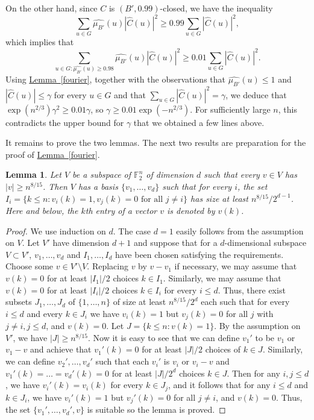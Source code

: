 \documentclass[11pt]{article}
\numberwithin{equation}{section}
\newtheorem{lemma}[theorem]{Lemma}
\theoremstyle{definition}
\theoremstyle{plain}
\newcommand{\expref}[2]{\hyperref[#2]{#1~\ref{#2}}}
\newcommand\g{\gamma}
\newcommand \hC {{\hat C}}
\begin{document}
On the other hand, since $C$ is $(B',0.99)$-closed, we have the inequality
\[\sum_{u\in G} \widehat{\mu_{B'}}(u)|\hC(u)|^2\geq 0.99\sum_{u\in G}|\hC(u)|^2,\]
which implies that 
\[\sum_{u\in G: \widehat{\mu_{B'}}(u)\geq 0.98} \widehat{\mu_{B'}}(u)|\hC(u)|^2\geq 0.01\sum_{u\in G}|\hC(u)|^2.\]
Using \expref{Lemma}{fourier}, together with the observations that $\widehat{\mu_{B'}}(u)\leq 1$ and $|\hC(u)|\leq \g$ for every $u\in G$ and that $\sum_{u\in G}|\hC(u)|^2=\g$, we deduce that $\exp(n^{2/3})\g^2\geq 0.01 \g$, so $\g\geq 0.01\exp(-n^{2/3})$. For sufficiently large $n$, this contradicts the upper bound for $\g$ that we obtained a few lines above. 
\medskip

It remains to prove the two lemmas. The next two results are preparation for the proof of \expref{Lemma}{fourier}.

\begin{lemma}\label{Claim2} Let $V$ be a subspace of $\mathbb{F}_2^n$ of dimension $d$ such that every $v\in V$ has $|v|\geq n^{8/15}$. Then $V$ has a basis $\{v_1,\dots,v_d\}$ such that for every $i$, the set $I_i=\{k\leq n: v_i(k)=1,v_j(k)=0 \text{ for all } j\neq i\}$ has size at least $n^{8/15}/2^{d-1}$. Here and below, the $k$th entry of a vector $v$ is denoted by $v(k)$.
\end{lemma}

\begin{proof} We use induction on $d$. The case $d=1$ easily follows from the assumption on $V$. Let $V'$ have dimension $d+1$ and suppose that for a $d$-dimensional subspace $V\subset V'$, $v_1,\dots,v_d$ and $I_1,\dots,I_d$ have been chosen satisfying the requirements. Choose some $v\in V'\setminus V$. Replacing $v$ by $v-v_1$ if necessary, we may assume that $v(k)=0$ for at least $|I_1|/2$ choices $k\in I_1$. Similarly, we may assume that $v(k)=0$ for at least $|I_i|/2$ choices $k\in I_i$ for every $i\leq d$. Thus, there exist subsets $J_1,\dots,J_d$ of $\{1,\dots,n\}$ of size at least $n^{8/15}/2^d$ each such that for every $i\leq d$ and every $k\in J_i$ we have $v_i(k)=1$ but  $v_j(k)=0$ for all $j$ with $j\neq i,j\leq d$, and $v(k)=0$. Let $J=\{k\leq n: v(k)=1\}$. By the assumption on $V'$, we have $|J|\geq n^{8/15}$. Now it is easy to see that we can define $v_1'$ to be $v_1$ or $v_1-v$ and achieve that $v_1'(k)=0$ for at least $|J|/2$ choices of $k\in J$. Similarly, we can define $v_2',\dots,v_d'$ such that each $v_i'$ is $v_i$ or $v_i-v$ and $v_1'(k)=\dots=v_d'(k)=0$ for at least $|J|/2^d$ choices $k\in J$. Then for any $i,j\leq d$, we have $v_i'(k)=v_i(k)$ for every $k\in J_j$, and it follows that for any $i\leq d$ and $k\in J_i$, we have $v_i'(k)=1$ but $v_j'(k)=0$ for all $j\neq i$, and $v(k)=0$. Thus, the set $\{v_1',\dots,v_d',v\}$ is suitable so the lemma is proved.
\end{proof}
\end{document}
